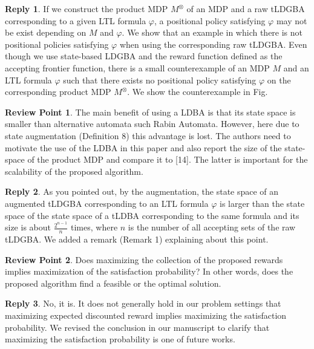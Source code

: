 \documentclass[10 pt, dvipdfmx]{article}
\theoremstyle{definition}
\newtheorem{review point}{Review Point}[section]
\newtheorem*{reply}{Reply}
\begin{document}
\begin{reply}
  If we construct the product MDP $M^{\otimes}$ of an MDP and a raw tLDGBA corresponding to a given LTL formula $\varphi$, a positional policy satisfying $\varphi$ may not be exist depending on $M$ and $\varphi$. We show that an example in which there is not positional policies satisfying $\varphi$ when using the corresponding raw tLDGBA. Even though we use state-based LDGBA and the reward function defined as the accepting frontier function, there is a small counterexample of an MDP $M$ and an LTL formula $\varphi$ such that there exists no positional policy satisfying $\varphi$ on the corresponding product MDP $M^{\otimes}$. We show the counterexample in Fig.
\end{reply}

\begin{review point}
  The main benefit of using a LDBA is that its state space is smaller
than alternative automata such Rabin Automata. However, here due to
state augmentation (Definition 8) this advantage is lost. The authors
need to motivate the use of the LDBA in this paper and also report the
size of the state-space of the product MDP and compare it to [14]. The
latter is important for the scalability of the proposed algorithm.
\end{review point}

\begin{reply}
 As you pointed out, by the augmentation, the state space of an augmented tLDGBA corresponding to an LTL formula $\varphi$ is larger than the state space of the state space of a tLDBA corresponding to the same formula and its size is about $\frac{2^{n-1}}{n}$ times, where $n$ is the number of all accepting sets of the raw tLDGBA. We added a remark (Remark 1) explaining about this point.
\end{reply}

\begin{review point}
  Does maximizing the collection of the proposed rewards implies
maximization of the satisfaction probability? In other words, does the
proposed algorithm find a feasible or the optimal solution.
\end{review point}

\begin{reply}
 No, it is. It does not generally hold in our problem settings that maximizing expected discounted reward implies maximizing the satisfaction probability. We revised the conclusion in our manuscript to clarify that maximizing the satisfaction probability is one of future works.
\end{reply}
\end{document}
